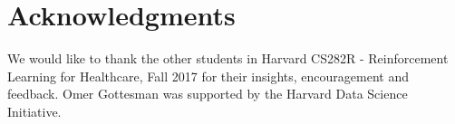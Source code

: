 \documentclass[10pt]{amia}
\begin{document}

\section*{Acknowledgments}

We would like to thank the other students in Harvard CS282R - Reinforcement Learning for Healthcare,  Fall 2017 for their insights, encouragement and feedback. Omer Gottesman was supported by the Harvard Data Science Initiative.

\makeatletter
\renewcommand{\@biblabel}[1]{\hfill #1.}
\makeatother





\end{document}
